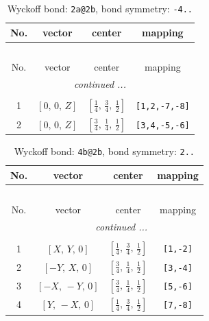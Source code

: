 \documentclass[fleqn,8pt]{jsarticle}
\begin{document}
\begin{longtable}{cccc}
\caption{Wyckoff bond: {\tt 2a@2b}, bond symmetry: {\tt -4..}}
 \\
 \hline \hline
No. & vector & center & mapping \\ \hline \endfirsthead

\multicolumn{3}{l}{\tablename\ \thetable{}} \\
 \hline \hline
No. & vector & center & mapping \\ \hline \endhead

 \hline \hline
\multicolumn{3}{r}{\footnotesize\it continued ...} \\ \endfoot

 \hline \hline
\multicolumn{3}{r}{} \\ \endlastfoot

1 & $\left[ 0,\, 0,\, Z \right]$ & $\left[ \frac{1}{4},\, \frac{3}{4},\, \frac{1}{2} \right]$ & {\tt [1,2,-7,-8]} \\ \hline
2 & $\left[ 0,\, 0,\, Z \right]$ & $\left[ \frac{3}{4},\, \frac{1}{4},\, \frac{1}{2} \right]$ & {\tt [3,4,-5,-6]} \\
\end{longtable}
\renewcommand{\arraystretch}{1.2}
\begin{longtable}{cccc}
\caption{Wyckoff bond: {\tt 4b@2b}, bond symmetry: {\tt 2..}}
 \\
 \hline \hline
No. & vector & center & mapping \\ \hline \endfirsthead

\multicolumn{3}{l}{\tablename\ \thetable{}} \\
 \hline \hline
No. & vector & center & mapping \\ \hline \endhead

 \hline \hline
\multicolumn{3}{r}{\footnotesize\it continued ...} \\ \endfoot

 \hline \hline
\multicolumn{3}{r}{} \\ \endlastfoot

1 & $\left[ X,\, Y,\, 0 \right]$ & $\left[ \frac{1}{4},\, \frac{3}{4},\, \frac{1}{2} \right]$ & {\tt [1,-2]} \\ \hline
2 & $\left[ - Y,\, X,\, 0 \right]$ & $\left[ \frac{3}{4},\, \frac{1}{4},\, \frac{1}{2} \right]$ & {\tt [3,-4]} \\ \hline
3 & $\left[ - X,\, - Y,\, 0 \right]$ & $\left[ \frac{3}{4},\, \frac{1}{4},\, \frac{1}{2} \right]$ & {\tt [5,-6]} \\ \hline
4 & $\left[ Y,\, - X,\, 0 \right]$ & $\left[ \frac{1}{4},\, \frac{3}{4},\, \frac{1}{2} \right]$ & {\tt [7,-8]} \\
\end{longtable}
\end{document}
